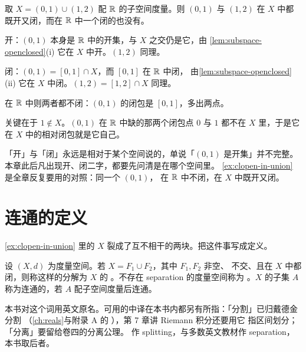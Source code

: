 \begin{example}
  \label{ex:clopen-in-union}
  取 \(X = (0,1) \cup (1,2)\) 配 \(\mathbb{R}\) 的子空间度量。则 \((0,1)\) 与 \((1,2)\)
  在 \(X\) 中都既开又闭，而在 \(\mathbb{R}\) 中一个闭的也没有。
  \begin{worked}
    开：\((0,1)\) 本身是 \(\mathbb{R}\) 中的开集，与 \(X\) 之交仍是它，由%
    \cref{lem:subspace-openclosed}(i) 它在 \(X\) 中开。\((1,2)\) 同理。

    闭：\((0,1) = [0,1] \cap X\)，而 \([0,1]\) 在 \(\mathbb{R}\) 中闭，
    由\cref{lem:subspace-openclosed}(ii) 它在 \(X\) 中闭。\((1,2) = [1,2] \cap X\) 同理。

    在 \(\mathbb{R}\) 中则两者都不闭：\((0,1)\) 的闭包是 \([0,1]\)，多出两点。

    关键在于 \(1 \notin X\)。\((0,1)\) 在 \(\mathbb{R}\) 中缺的那两个闭包点 \(0\) 与 \(1\)
    都不在 \(X\) 里，于是它在 \(X\) 中的相对闭包就是它自己。
  \end{worked}
\end{example}

\begin{pitfall}
  「开」与「闭」永远是相对于某个空间说的，单说「\((0,1)\) 是开集」并不完整。
  本章此后凡出现开、闭二字，都要先问清是在哪个空间里。
  \cref{ex:clopen-in-union} 是全章反复要用的对照：同一个 \((0,1)\)，
  在 \(\mathbb{R}\) 中不闭，在 \(X\) 中既开又闭。
\end{pitfall}

\section{连通的定义}
\label{sec:connected-def}

\cref{ex:clopen-in-union} 里的 \(X\) 裂成了互不相干的两块。把这件事写成定义。

\begin{definition}
  \label{def:separation}
  设 \((X,d)\) 为度量空间。若 \(X = F_{1} \cup F_{2}\)，其中 \(F_{1},F_{2}\) 非空、
  不交、且在 \(X\) 中都闭，则称这样的分解为 \(X\) 的%
  。不存在 separation 的度量空间称为%
  。\(X\) 的子集 \(A\) 称为连通的，若 \(A\) 配子空间度量后连通。
\end{definition}

\begin{remark}
  本书对这个词用英文原名。可用的中译在本书内都另有所指：「分割」已归戴德金分割
  （\cref{ch:reals}与附录 A 的 ），第 7 章讲 Riemann 积分还要用它
  指区间划分；「分离」要留给卷四的分离公理。
  \textcite{garling2013b}作 splitting，\textcite{pugh2015}与多数英文教材作
  separation，本书取后者。
\end{remark}

